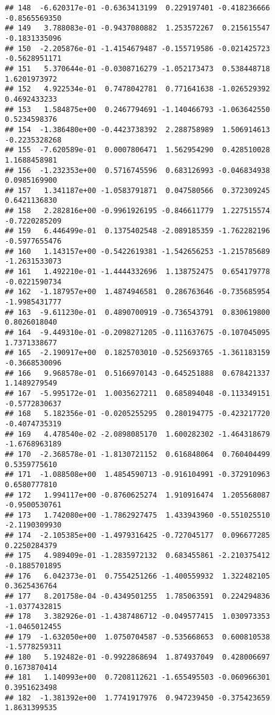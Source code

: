 \documentclass[
]{article}
\begin{document}
\begin{verbatim}
## 148  -6.620317e-01 -0.6363413199  0.229197401 -0.418236666 -0.8565569350
## 149   3.788083e-01 -0.9437080882  1.253572267  0.215615547 -0.1831335096
## 150  -2.205876e-01 -1.4154679487 -0.155719586 -0.021425723 -0.5628951171
## 151   5.370644e-01 -0.0308716279 -1.052173473  0.538448718  1.6201973972
## 152   4.922534e-01  0.7478042781  0.771641638 -1.026529392  0.4692433233
## 153   1.584875e+00  0.2467794691 -1.140466793 -1.063642550  0.5234598376
## 154  -1.386480e+00 -0.4423738392  2.288758989  1.506914613 -0.2235328268
## 155  -7.620589e-01  0.0007806471  1.562954290  0.428510028  1.1688458981
## 156  -1.232353e+00  0.5716745596  0.683126993 -0.046834938  0.0985169900
## 157   1.341187e+00 -1.0583791871  0.047580566  0.372309245  0.6421136830
## 158   2.282816e+00 -0.9961926195 -0.846611779  1.227515574 -0.7220285209
## 159   6.446499e-01  0.1375402548 -2.089185359 -1.762282196 -0.5977655476
## 160   1.143157e+00 -0.5422619381 -1.542656253 -1.215785689 -1.2631533073
## 161   1.492210e-01 -1.4444332696  1.138752475  0.654179778 -0.0221590734
## 162  -1.187957e+00  1.4874946581  0.286763646 -0.735685954 -1.9985431777
## 163  -9.611230e-01  0.4890700919 -0.736543791  0.830619800  0.8026018040
## 164  -9.449310e-01 -0.2098271205 -0.111637675 -0.107045095  1.7371338677
## 165  -2.190917e+00  0.1825703010 -0.525693765 -1.361183159 -0.3668530096
## 166   9.968578e-01  0.5166970143 -0.645251888  0.678421337  1.1489279549
## 167  -5.995172e-01  1.0035627211  0.685894048 -0.113349151 -0.5772830637
## 168   5.182356e-01 -0.0205255295  0.280194775 -0.423217720 -0.4074735319
## 169   4.478540e-02 -2.0898085170  1.600282302 -1.464318679 -1.6768963189
## 170  -2.368578e-01 -1.8130721152  0.616848064  0.760404499  0.5359775610
## 171  -1.088508e+00  1.4854590713 -0.916104991 -0.372910963  0.6580777810
## 172   1.994117e+00 -0.8760625274  1.910916474  1.205568087 -0.9500530761
## 173   1.742080e+00 -1.7862927475  1.433943960 -0.551025510 -2.1190309930
## 174  -2.105385e+00 -1.4979316425 -0.727045177  0.096677285  0.2250284379
## 175   4.989409e-01 -1.2835972132  0.683455861 -2.210375412 -0.1885701895
## 176   6.042373e-01  0.7554251266 -1.400559932  1.322482105  0.3625436764
## 177   8.201758e-04 -0.4349501255  1.785063591  0.224294836 -1.0377432815
## 178   3.382926e-01 -1.4387486712 -0.049577415  1.030973353 -1.0465012455
## 179  -1.632050e+00  1.0750704587 -0.535668653  0.600810538 -1.5778259311
## 180   5.192482e-01 -0.9922868694  1.874937049  0.428006697  0.1673870414
## 181   1.140993e+00  0.7208112621 -1.655495503 -0.060966301  0.3951623498
## 182  -1.381392e+00  1.7741917976  0.947239450 -0.375423659  1.8631399535

\end{verbatim}
\end{document}
